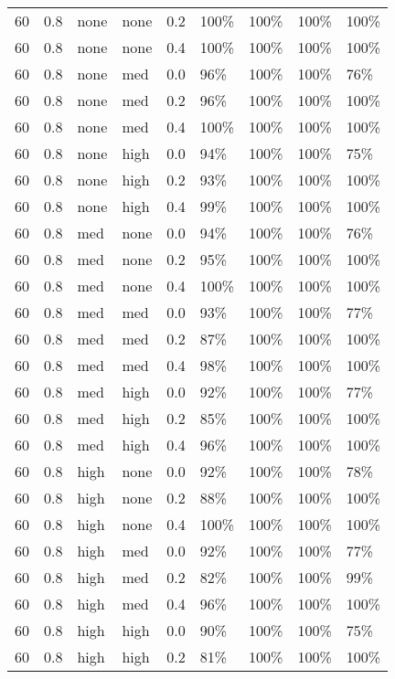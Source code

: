 \begin{longtable}{rrllrllll}
  60 & 0.8 & none & none & 0.2 & 100\% & 100\% & 100\% & 100\% \\ 
  60 & 0.8 & none & none & 0.4 & 100\% & 100\% & 100\% & 100\% \\ 
  60 & 0.8 & none & med & 0.0 & 96\% & 100\% & 100\% & 76\% \\ 
  60 & 0.8 & none & med & 0.2 & 96\% & 100\% & 100\% & 100\% \\ 
  60 & 0.8 & none & med & 0.4 & 100\% & 100\% & 100\% & 100\% \\ 
  60 & 0.8 & none & high & 0.0 & 94\% & 100\% & 100\% & 75\% \\ 
  60 & 0.8 & none & high & 0.2 & 93\% & 100\% & 100\% & 100\% \\ 
  60 & 0.8 & none & high & 0.4 & 99\% & 100\% & 100\% & 100\% \\ 
  60 & 0.8 & med & none & 0.0 & 94\% & 100\% & 100\% & 76\% \\ 
  60 & 0.8 & med & none & 0.2 & 95\% & 100\% & 100\% & 100\% \\ 
  60 & 0.8 & med & none & 0.4 & 100\% & 100\% & 100\% & 100\% \\ 
  60 & 0.8 & med & med & 0.0 & 93\% & 100\% & 100\% & 77\% \\ 
  60 & 0.8 & med & med & 0.2 & 87\% & 100\% & 100\% & 100\% \\ 
  60 & 0.8 & med & med & 0.4 & 98\% & 100\% & 100\% & 100\% \\ 
  60 & 0.8 & med & high & 0.0 & 92\% & 100\% & 100\% & 77\% \\ 
  60 & 0.8 & med & high & 0.2 & 85\% & 100\% & 100\% & 100\% \\ 
  60 & 0.8 & med & high & 0.4 & 96\% & 100\% & 100\% & 100\% \\ 
  60 & 0.8 & high & none & 0.0 & 92\% & 100\% & 100\% & 78\% \\ 
  60 & 0.8 & high & none & 0.2 & 88\% & 100\% & 100\% & 100\% \\ 
  60 & 0.8 & high & none & 0.4 & 100\% & 100\% & 100\% & 100\% \\ 
  60 & 0.8 & high & med & 0.0 & 92\% & 100\% & 100\% & 77\% \\ 
  60 & 0.8 & high & med & 0.2 & 82\% & 100\% & 100\% & 99\% \\ 
  60 & 0.8 & high & med & 0.4 & 96\% & 100\% & 100\% & 100\% \\ 
  60 & 0.8 & high & high & 0.0 & 90\% & 100\% & 100\% & 75\% \\ 
  60 & 0.8 & high & high & 0.2 & 81\% & 100\% & 100\% & 100\% \\ 

\end{longtable}
